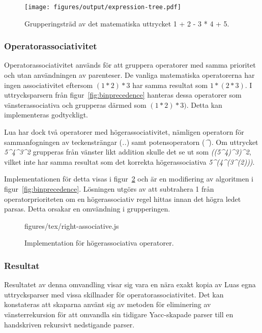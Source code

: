 \begin{figure}[ht]
  \texttt{[image: figures/output/expression-tree.pdf]}
  \caption{Grupperingsträd av det matematiska uttrycket 1 + 2 - 3 * 4 + 5.}
  \label{fig:expressiontree}
\end{figure}

\subsubsection{Operatorassociativitet}

Operatorassociativitet används för att gruppera operatorer med samma prioritet
och utan användningen av parenteser. De vanliga matematiska operatorerna har ingen
associativitet eftersom $(1 * 2) * 3$ har samma resultat som $1 * (2 * 3)$. I
uttrycksparsern från figur~\ref{fig:binprecedence} hanteras dessa operatorer
som vänsterassociativa och grupperas därmed som $(1 * 2) * 3)$. Detta kan
implementeras godtyckligt.

Lua har dock två operatorer med högerassociativitet, nämligen operatorn för
sammanfogningen av teckensträngar (\textit{..}) samt potensoperatorn
(\textit{\^{}}). Om uttrycket \textit{5\^{}4\^{}3\^{}2} grupperas från vänster likt
addition skulle det se ut som \textit{((5\^{}4)\^{}3)\^{}2}, vilket inte har
samma resultat som det korrekta högerassociativa \textit{5\^{}(4\^{}(3\^{}(2)))}.

Implementationen för detta visas i figur~\ref{fig:rightassociative} och är en
modifiering av algoritmen i figur~\ref{fig:binprecedence}. Lösningen utgörs av
att subtrahera 1 från operatorprioriteten om en högerassociativ regel hittas
innan det högra ledet parsas. Detta orsakar en omvändning i grupperingen.

\begin{figure}[ht]
    {figures/tex/right-associative.js}
  \caption{Implementation för högerassociativa operatorer.}
  \label{fig:rightassociative}
\end{figure}

\subsubsection{Resultat}

Resultatet av denna omvandling visar sig vara en nära exakt kopia av Luas egna
uttrycksparser med vissa skillnader för operatorassociativitet. Det kan
konstateras att skaparna använt sig av metoden för eliminering av
vänsterrekursion för att omvandla sin tidigare Yacc-skapade parser till en
handskriven rekursivt nedstigande parser.

